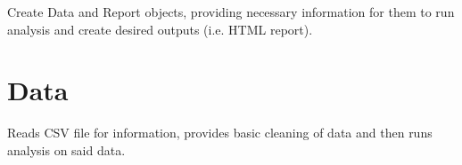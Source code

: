 \documentclass[letterpaper,10pt,english]{sphinxmanual}
\begin{document}
\begin{fulllineitems}
\label{Code_rst/app:application.main}
Create Data and Report objects, providing necessary information for them 
to run analysis and create desired outputs (i.e. HTML report).

\end{fulllineitems}



\section{Data}
\label{Code_rst/dat:module-data}\label{Code_rst/dat::doc}\label{Code_rst/dat:data}
Reads CSV file for information, provides basic cleaning of data and then
runs analysis on said data.
\end{document}
